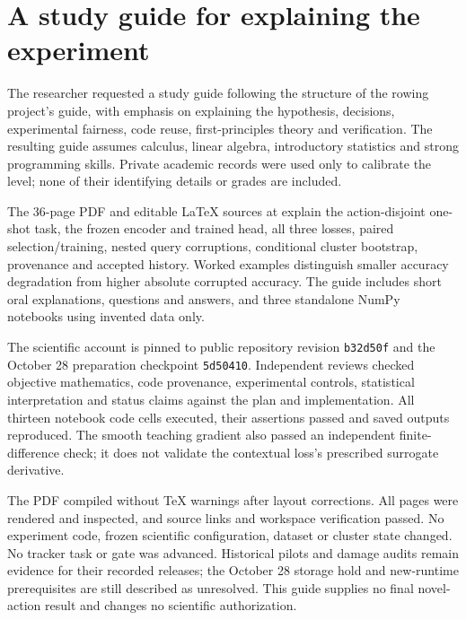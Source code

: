 \section{A study guide for explaining the experiment}

The researcher requested a study guide following the structure of the rowing
project's guide, with emphasis on explaining the hypothesis, decisions,
experimental fairness, code reuse, first-principles theory and verification.
The resulting guide assumes calculus, linear algebra, introductory statistics
and strong programming skills. Private academic records were used only to
calibrate the level; none of their identifying details or grades are included.

The 36-page PDF and editable LaTeX sources at  explain the
action-disjoint one-shot task, the frozen encoder and trained head, all three
losses, paired selection/training, nested query corruptions, conditional
cluster bootstrap, provenance and accepted history. Worked examples distinguish
smaller accuracy degradation from higher absolute corrupted accuracy. The
guide includes short oral explanations, questions and answers, and three
standalone NumPy notebooks using invented data only.

The scientific account is pinned to public repository revision
\texttt{b32d50f} and the October 28 preparation checkpoint \texttt{5d50410}.
Independent reviews checked objective mathematics, code provenance,
experimental controls, statistical interpretation and status claims against
the plan and implementation. All thirteen notebook code cells executed, their
assertions passed and saved outputs reproduced. The smooth teaching gradient
also passed an independent finite-difference check; it does not validate the
contextual loss's prescribed surrogate derivative.

The PDF compiled without TeX warnings after layout corrections. All pages were
rendered and inspected, and source links and workspace verification passed.
No experiment code, frozen scientific configuration, dataset or cluster state
changed. No tracker task or gate was advanced. Historical pilots and damage
audits remain evidence for their recorded releases; the October 28 storage hold
and new-runtime prerequisites are still described as unresolved. This guide
supplies no final novel-action result and changes no scientific authorization.

